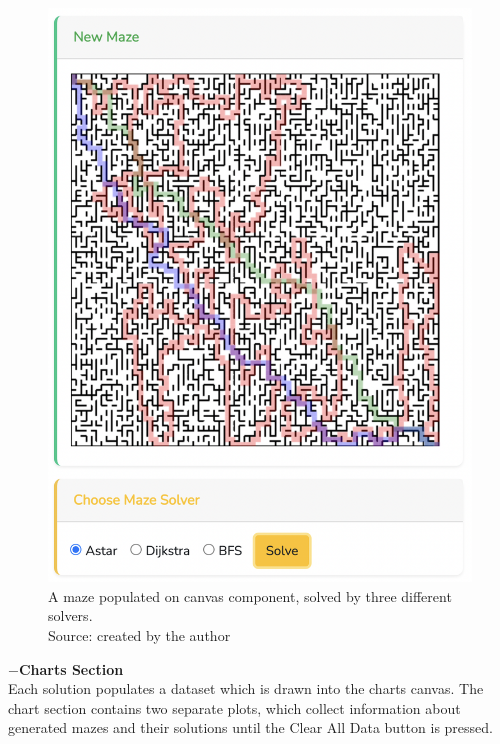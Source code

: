 \begin{figure}[!h]
    \centering
    \centering
    \includegraphics[scale =0.3 ]{mazeSolutions}
    \caption{A maze populated on canvas component, solved by three different solvers.\\Source: created by the author}
    \end{figure}
\newline    
\textbf{$-$Charts Section}\\
Each solution populates a dataset which is drawn into the charts canvas. The chart section contains two separate plots, which collect information about 
generated mazes and their solutions until the Clear All Data button is pressed.\\
